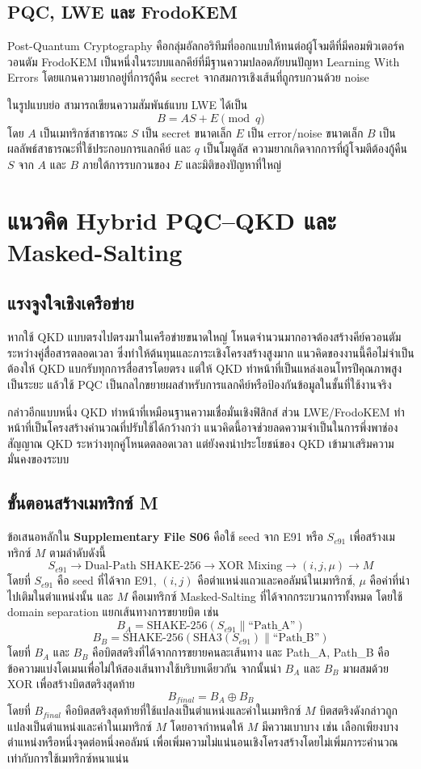 \documentclass[14pt,a4paper]{extarticle}
\newcommand{\eng}[1]{\textenglish{#1}}
\newcommand{\suppfile}[1]{\textbf{Supplementary File #1}}
\begin{document}
\subsection{PQC, LWE และ FrodoKEM}
\eng{Post-Quantum Cryptography} คือกลุ่มอัลกอริทึมที่ออกแบบให้ทนต่อผู้โจมตีที่มีคอมพิวเตอร์ควอนตัม FrodoKEM เป็นหนึ่งในระบบแลกคีย์ที่มีฐานความปลอดภัยบนปัญหา \eng{Learning With Errors} โดยแกนความยากอยู่ที่การกู้คืน secret จากสมการเชิงเส้นที่ถูกรบกวนด้วย noise

ในรูปแบบย่อ สามารถเขียนความสัมพันธ์แบบ LWE ได้เป็น
\[
    B = AS + E \pmod q
\]
โดย $A$ เป็นเมทริกซ์สาธารณะ $S$ เป็น secret ขนาดเล็ก $E$ เป็น error/noise ขนาดเล็ก $B$ เป็นผลลัพธ์สาธารณะที่ใช้ประกอบการแลกคีย์ และ $q$ เป็นโมดูลัส ความยากเกิดจากการที่ผู้โจมตีต้องกู้คืน $S$ จาก $A$ และ $B$ ภายใต้การรบกวนของ $E$ และมิติของปัญหาที่ใหญ่

\section{แนวคิด Hybrid PQC--QKD และ Masked-Salting}
\subsection{แรงจูงใจเชิงเครือข่าย}
หากใช้ QKD แบบตรงไปตรงมาในเครือข่ายขนาดใหญ่ โหนดจำนวนมากอาจต้องสร้างคีย์ควอนตัมระหว่างคู่สื่อสารตลอดเวลา ซึ่งทำให้ต้นทุนและภาระเชิงโครงสร้างสูงมาก แนวคิดของงานนี้คือไม่จำเป็นต้องให้ QKD แบกรับทุกการสื่อสารโดยตรง แต่ให้ QKD ทำหน้าที่เป็นแหล่งเอนโทรปีคุณภาพสูงเป็นระยะ แล้วใช้ PQC เป็นกลไกขยายผลสำหรับการแลกคีย์หรือป้องกันข้อมูลในชั้นที่ใช้งานจริง

กล่าวอีกแบบหนึ่ง QKD ทำหน้าที่เหมือนฐานความเชื่อมั่นเชิงฟิสิกส์ ส่วน LWE/FrodoKEM ทำหน้าที่เป็นโครงสร้างคำนวณที่ปรับใช้ได้กว้างกว่า แนวคิดนี้อาจช่วยลดความจำเป็นในการพึ่งพาช่องสัญญาณ QKD ระหว่างทุกคู่โหนดตลอดเวลา แต่ยังคงนำประโยชน์ของ QKD เข้ามาเสริมความมั่นคงของระบบ

\subsection{ขั้นตอนสร้างเมทริกซ์ M}
ข้อเสนอหลักใน \suppfile{S06} คือใช้ seed จาก E91 หรือ $S_{e91}$ เพื่อสร้างเมทริกซ์ $M$ ตามลำดับดังนี้
\[
    S_{e91} \rightarrow \text{Dual-Path SHAKE-256} \rightarrow \text{XOR Mixing} \rightarrow (i,j,\mu) \rightarrow M
\]
โดยที่ $S_{e91}$ คือ seed ที่ได้จาก E91, $(i,j)$ คือตำแหน่งแถวและคอลัมน์ในเมทริกซ์, $\mu$ คือค่าที่นำไปเติมในตำแหน่งนั้น และ $M$ คือเมทริกซ์ \eng{Masked-Salting} ที่ได้จากกระบวนการทั้งหมด
โดยใช้ domain separation แยกเส้นทางการขยายบิต เช่น
\[
    B_A = \text{SHAKE-256}(S_{e91} \parallel \text{``Path\_A''})
\]
\[
    B_B = \text{SHAKE-256}(\text{SHA3}(S_{e91}) \parallel \text{``Path\_B''})
\]
โดยที่ $B_A$ และ $B_B$ คือบิตสตริงที่ได้จากการขยายคนละเส้นทาง และ \eng{Path\_A}, \eng{Path\_B} คือข้อความแบ่งโดเมนเพื่อไม่ให้สองเส้นทางใช้บริบทเดียวกัน
จากนั้นนำ $B_A$ และ $B_B$ มาผสมด้วย XOR เพื่อสร้างบิตสตริงสุดท้าย
\[
    B_{final} = B_A \oplus B_B
\]
โดยที่ $B_{final}$ คือบิตสตริงสุดท้ายที่ใช้แปลงเป็นตำแหน่งและค่าในเมทริกซ์ $M$
บิตสตริงดังกล่าวถูกแปลงเป็นตำแหน่งและค่าในเมทริกซ์ $M$ โดยอาจกำหนดให้ $M$ มีความเบาบาง เช่น เลือกเพียงบางตำแหน่งหรือหนึ่งจุดต่อหนึ่งคอลัมน์ เพื่อเพิ่มความไม่แน่นอนเชิงโครงสร้างโดยไม่เพิ่มภาระคำนวณเท่ากับการใช้เมทริกซ์หนาแน่น
\end{document}
